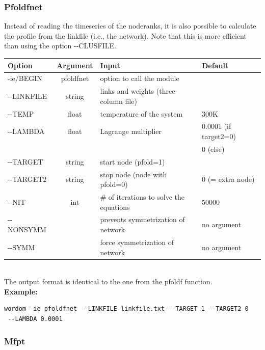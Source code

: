 \documentclass[11pt,twoside,onecolumn,a4paper,openright,notitlepage]{book}[2001/04/21]
\begin{document}
\subsubsection{Pfoldfnet}

Instead of reading the timeseries of the noderanks, it is also possible to calculate the profile from the linkfile (i.e., the network). Note that this is more efficient than using the option -{}-CLUSFILE.\\

\noindent\begin{tabular}{l|c|l|l}
Option & Argument & Input & Default \\
\hline
-ie/BEGIN    & pfoldfnet & option to call the module\\
-{}-LINKFILE & string & links and weights (three-column file)\\
-{}-TEMP     & float  & temperature of the system & 300K \\
-{}-LAMBDA   & float  & Lagrange multiplier & 0.0001 (if target2=0) \\ 
 &&&0 (else) \\
-{}-TARGET   & string & start node (pfold=1) \\
-{}-TARGET2  & string & stop node (node with pfold=0) & 0 (= extra node) \\
-{}-NIT      & int    &  \# of iterations to solve the equations &  50000\\
-{}-NONSYMM  &        &  prevents symmetrization of network & no argument\\
-{}-SYMM     &        &  force symmetrization of network & no argument\\
\end{tabular}\\

\noindent The output format is identical to the one from the pfoldf function.\\


{\bf Example:}

\begin{verbatim}wordom -ie pfoldfnet --LINKFILE linkfile.txt --TARGET 1 --TARGET2 0
 --LAMBDA 0.0001 \end{verbatim}


\subsubsection{Mfpt}
\end{document}
